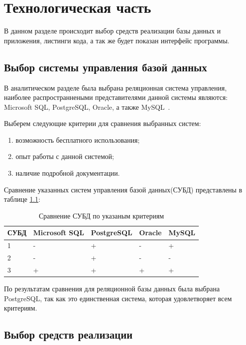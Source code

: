 \chapter{Технологическая часть}

В данном разделе происходит выбор средств 
реализации базы данных и приложения, 
листинги кода, а так же будет показан интерфейс программы.


\section{Выбор системы управления базой данных}

В аналитическом разделе была выбрана реляционная 
система управления, наиболее распространнеными представителями
данной системы являются: 
Microsoft SQL, PostgreSQL, Oracle, а также MySQL~\cite{diffdb}. 

Выберем следующие критерии для сравнения выбранных систем:
\begin{enumerate}
    \item[1)] возможность бесплатного использования;
    \item[2)] опыт работы с данной системой;
    \item[3)] наличие подробной документации. 
\end{enumerate}

Сравнение указанных систем управления базой данных(СУБД)
представлены в таблице \ref{tab:diff}:

\begin{table}[!ht]
    \centering
    \caption{\label{tab:diff} Сравнение СУБД по указаным критериям}
    \begin{tabular}{|l|l|l|l|l|}
    \hline
        СУБД & Microsoft SQL & PostgreSQL & Oracle & MySQL \\ \hline
        1 & - & + & - & +  \\ \hline
        2 & - & + & - & -  \\ \hline
        3 & + & + & + & +  \\ \hline
    \end{tabular}
\end{table}

По результатам сравнения для реляционной базы данных была выбрана PostgreSQL, так как это 
единственная система, которая удовлетворяет всем критериям.

\section{Выбор средств реализации}


